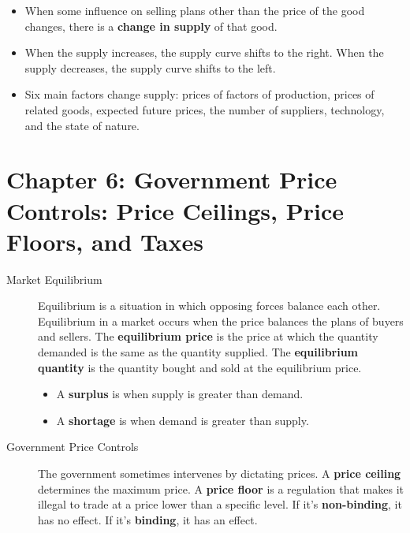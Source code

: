 \documentclass{article}
\begin{document}
\begin{description}
    \begin{itemize}
        \item When some influence on selling plans other than the price of the good changes, there is a \textbf{change in supply} of that good.
        \item When the supply increases, the supply curve shifts to the right. When the supply decreases, the supply curve shifts to the left.
        \item Six main factors change supply: prices of factors of production, prices of related goods, expected future prices, the number of suppliers, technology, and the state of nature.
    \end{itemize}
\end{description}
\section*{Chapter 6: Government Price Controls: Price Ceilings, Price Floors, and Taxes}
\begin{description}
    \item [Market Equilibrium] Equilibrium is a situation in which opposing forces balance each other. Equilibrium in a market occurs when the price balances the plans of buyers and sellers. The \textbf{equilibrium price} is the price at which the quantity demanded is the same as the quantity supplied. The \textbf{equilibrium quantity} is the quantity bought and sold at the equilibrium price.
    \begin{itemize}
        \item A \textbf{surplus} is when supply is greater than demand.
        \item A \textbf{shortage} is when demand is greater than supply.
    \end{itemize}
    \item [Government Price Controls] The government sometimes intervenes by dictating prices. A \textbf{price ceiling} determines the maximum price. A \textbf{price floor} is a regulation that makes it illegal to trade at a price lower than a specific level. If it's \textbf{non-binding}, it has no effect. If it's \textbf{binding}, it has an effect.
\end{description}
\end{document}
